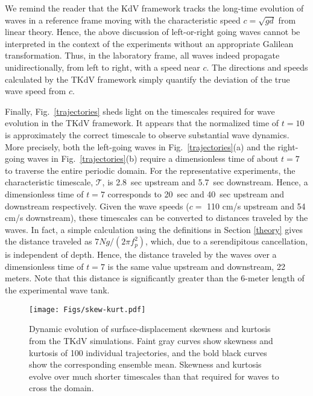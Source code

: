 \documentclass[11pt]{article}
\newcommand{\new}[1]{{ #1}}
\newcommand{\freqp}{f_p}
\newcommand{\depth}{d}
\newcommand{\lamfac}{N}
\newcommand{\timescale}{\mathcal{T}}
\begin{document}
	We remind the reader that the KdV framework tracks the long-time evolution of waves in a reference frame moving with the characteristic speed $c = \sqrt{g \depth}$ from linear theory. Hence, the above discussion of left-or-right going waves cannot be interpreted in the context of the experiments without an appropriate Galilean transformation. Thus, in the laboratory frame, all waves indeed propagate unidirectionally, from left to right, with a speed near $c$. The directions and speeds calculated by the TKdV framework simply quantify the deviation of the true wave speed from $c$.
		
	Finally, Fig.~\ref{trajectories} sheds light on the timescales required for wave evolution in the TKdV framework. It appears that the normalized time of $t=10$ is \new{approximately} the correct timescale to observe substantial wave dynamics. More precisely, both the left-going waves in Fig.~\ref{trajectories}(a) and the right-going waves in Fig.~\ref{trajectories}(b) require a dimensionless time of about $t=7$ to traverse the entire periodic domain. For the representative experiments, the characteristic timescale, $\timescale$, is 2.8~sec upstream and 5.7~sec downstream. Hence, a dimensionless time of $t=7$ corresponds to 20~sec and 40~sec upstream and downstream respectively. Given the wave speeds ($c = $ 110 cm/s upstream and 54 cm/s downstream), these timescales can be converted to distances traveled by the waves. In fact, a simple calculation using the definitions in Section \ref{theory} gives the distance traveled as $7 \lamfac g/(2 \pi \freqp^2)$, which, due to a serendipitous cancellation, is independent of depth. Hence, the distance traveled by the waves over a dimensionless time of $t=7$ is the same value upstream and downstream, 22 meters. Note that this distance is significantly greater than the 6-meter length of the experimental wave tank.

\begin{figure}%
\begin{center}
\texttt{[image: Figs/skew-kurt.pdf]}
\caption{
Dynamic evolution of surface-displacement skewness and kurtosis from the TKdV simulations. Faint gray curves show skewness and kurtosis of 100 individual trajectories, and the bold black curves show the corresponding ensemble mean. Skewness and kurtosis evolve over much shorter timescales than that required for waves to cross the domain.}
\label{skew-kurt}
\end{center}
\end{figure}
 
\end{document}
